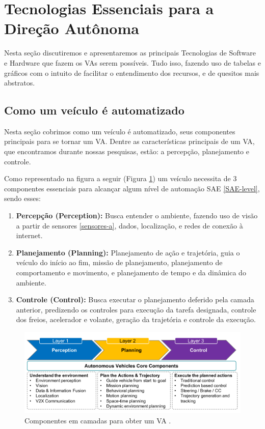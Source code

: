 \section{Tecnologias Essenciais para a Direção Autônoma}

Nesta seção discutiremos e apresentaremos as principais Tecnologias de Software e Hardware que fazem os VAs serem possíveis. Tudo isso, fazendo uso de tabelas e gráficos com o intuito de facilitar o entendimento dos recursos, e de quesitos mais abstratos. 


\subsection{Como um veículo é automatizado}
Nesta seção cobrimos como um veículo é automatizado, seus componentes principais para se tornar um VA. Dentre as características principais de um VA, que encontramos durante nossas pesquisas, estão: a percepção, planejamento e controle.

Como representado na figura a seguir (Figura \ref{figura_perception}) um veículo necessita de 3 componentes essenciais para alcançar algum nível de automação SAE \ref{SAE-level}, sendo esses:


\begin{enumerate}
 \item \textbf{Percepção (Perception):} Busca entender o ambiente, fazendo uso de visão a partir de sensores \ref{sensores-a}, dados, localização, e redes de conexão à internet.
\item \textbf{Planejamento (Planning):} Planejamento de ação e trajetória, guia o veículo do início ao fim, missão de planejamento, planejamento de comportamento e movimento, e planejamento de tempo e da dinâmica do ambiente.
\item \textbf{Controle (Control):} Busca executar o planejamento deferido pela camada anterior, predizendo os controles para execução da tarefa designada, controle dos freios, acelerador e volante, geração da trajetória e controle da execução.

\end{enumerate}

\begin{figure}[H]
\centering
\includegraphics[width=\textwidth]{Figures/perception.png}
\caption{Componentes em camadas para obter um VA \cite{sensors-yet}.}
\label{figura_perception}
\end{figure}

